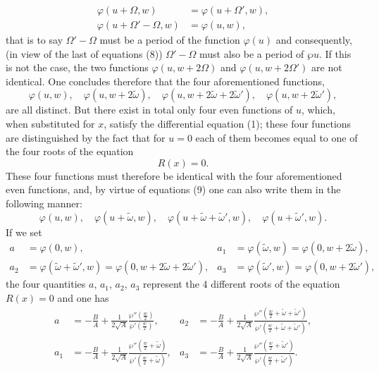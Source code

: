 \documentclass{article}
\begin{document}
\begin{align*}
\varphi(u + \Omega, w) &= \varphi(u + \Omega', w), \\
\varphi(u + \Omega' - \Omega, w) &= \varphi(u, w),
\end{align*}
that is to say $\Omega' - \Omega$ must be a period of the function $\varphi(u)$ and consequently, (in view of the last of equations (8)) $\Omega' - \Omega$ must also be a period of $\wp u$.
If this is not the case, the two functions $\varphi(u, w + 2\Omega)$ and $\varphi(u, w + 2\Omega')$ are not identical. 
One concludes therefore that the four aforementioned functions,
\[
\varphi(u, w), \quad \varphi(u, w + 2\tilde{\omega}), \quad \varphi(u, w + 2\tilde{\omega} + 2\tilde{\omega}'), \quad \varphi(u, w + 2\tilde{\omega}'),
\]
are all distinct.
But there exist in total only four even functions of $u$, which, when substituted for $x$, satisfy the differential equation (1); these four functions are distinguished by the fact that for $u = 0$ each of them becomes equal to one of the four roots of the equation
\[
R(x) = 0.
\]
These four functions must therefore be identical with the four aforementioned even functions, and, by virtue of equations (9) one can also write them in the following manner:
\[
\varphi(u, w), \quad \varphi(u + \tilde{\omega}, w), \quad \varphi(u + \tilde{\omega} + \tilde{\omega}', w), \quad \varphi(u + \tilde{\omega}', w).
\]
If we set
\begin{align*}
a &= \varphi(0, w), & a_1 &= \varphi(\tilde{\omega}, w) = \varphi(0, w + 2\tilde{\omega}), \\
a_2 &= \varphi(\tilde{\omega} + \tilde{\omega}', w) = \varphi(0, w + 2\tilde{\omega} + 2\tilde{\omega}'), & a_3 &= \varphi(\tilde{\omega}', w) = \varphi(0, w + 2\tilde{\omega}'),
\end{align*}
the four quantities $a$, $a_1$, $a_2$, $a_3$ represent the 4 different roots of the equation $R(x) = 0$ and one has
\begin{align*}
a &= -\frac{B}{A} + \frac{1}{2\sqrt{A}}\frac{\wp''\left(\frac{w}{2}\right)}{\wp'\left(\frac{w}{2}\right)}, &
a_2 &= -\frac{B}{A} + \frac{1}{2\sqrt{A}}\frac{\wp''\left(\frac{w}{2} + \tilde{\omega} + \tilde{\omega}'\right)}{\wp'\left(\frac{w}{2} + \tilde{\omega} + \tilde{\omega}'\right)}, \\
a_1 &= -\frac{B}{A} + \frac{1}{2\sqrt{A}}\frac{\wp''\left(\frac{w}{2} + \tilde{\omega}\right)}{\wp'\left(\frac{w}{2} + \tilde{\omega}\right)}, &
a_3 &= -\frac{B}{A} + \frac{1}{2\sqrt{A}}\frac{\wp''\left(\frac{w}{2} + \tilde{\omega}'\right)}{\wp'\left(\frac{w}{2} + \tilde{\omega}'\right)}.
\end{align*}
\end{document}
